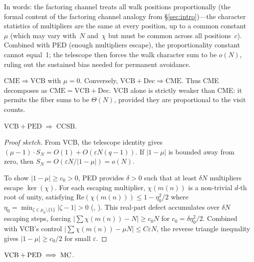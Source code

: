 In words: the factoring channel treats all walk positions
proportionally (the formal content of the factoring channel analogy
from \S\ref{sec:intro})---the character statistics of multipliers are
the same at every position, up to a common constant~$\mu$ (which may vary
with~$N$ and~$\chi$ but must be common across all positions~$c$).
Combined with PED (enough multipliers escape), the proportionality
constant cannot equal~1; the telescope then forces the walk character
sum to be $o(N)$, ruling out the sustained bias needed for permanent
avoidance.

\begin{proposition}
$\mathrm{CME} \Rightarrow \mathrm{VCB}$ with $\mu = 0$.
Conversely, $\mathrm{VCB} + \mathrm{Dec} \Rightarrow \mathrm{CME}$.
Thus CME decomposes as $\mathrm{CME} = \mathrm{VCB} + \mathrm{Dec}$.
VCB alone is strictly weaker than CME: it permits the fiber sums to
be $\Theta(N)$, provided they are proportional to the visit counts.
\end{proposition}

\begin{theorem}
\label{thm:vcb-ped-ccsb}
$\mathrm{VCB} + \mathrm{PED} \;\Longrightarrow\; \mathrm{CCSB}$.
\end{theorem}

\begin{proof}[Proof sketch]
From VCB, the telescope identity gives
$(\mu - 1) \cdot S_N = O(1) + O(\varepsilon N (q{-}1))$.
If $|1 - \mu|$ is bounded away from zero, then
$S_N = O(\varepsilon N / |1{-}\mu|) = o(N)$.

To show $|1 - \mu| \geq c_0 > 0$, PED provides $\delta > 0$ such
that at least $\delta N$ multipliers escape $\ker(\chi)$.  For each
escaping multiplier, $\chi(m(n))$ is a non-trivial $d$-th root of
unity, satisfying $\mathrm{Re}(\chi(m(n))) \leq 1 - \eta_0^2/2$
where $\eta_0 = \min_{\zeta \in \mu_d \setminus \{1\}} |\zeta - 1| > 0$
(,
).
This real-part defect accumulates over $\delta N$ escaping steps,
forcing $|\sum \chi(m(n)) - N| \geq c_0 N$ for
$c_0 = \delta \eta_0^2 / 2$.  Combined with VCB's control
$|\sum \chi(m(n)) - \mu N| \leq C \varepsilon N$, the reverse
triangle inequality gives $|1 - \mu| \geq c_0/2$ for small
$\varepsilon$.
\end{proof}

\begin{theorem}
$\mathrm{VCB} + \mathrm{PED} \;\Longrightarrow\; \mathrm{MC}$.
\end{theorem}

